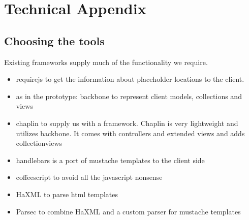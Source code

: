 \documentclass[thesis.tex]{subfiles}
\begin{document}
\appendix
\chapter{Technical Appendix}
\section{Choosing the tools}
Existing frameworks supply much of the functionality we require.
\begin{itemize}
\item requirejs to get the information about placeholder locations to the client.
\item as in the prototype: backbone to represent client models,
	collections and views
\item chaplin to supply us with a framework. Chaplin is very lightweight and
	utilizes backbone. It comes with controllers and extended views and adds
	collectionviews
\item handlebars is a port of mustache templates to the client side
\item coffeescript to avoid all the javascript nonsense
\item HaXML to parse html templates
\item Parsec to combine HaXML and a custom parser for mustache templates
\end{itemize}
\end{document}
